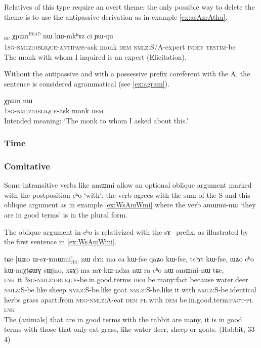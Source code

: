 \documentclass[oldfontcommands,oneside,a4paper,11pt]{article}
\newcommand{\ipa}[1]{{\phon #1}} %
\newcommand{\topic}{\textsc{dem}}
\newcommand{\tete}{\textsuperscript{\textsc{head}}}
\newcommand{\rc}{\textsubscript{\textsc{rc}}}
\begin{document}
Relatives of this type require an overt theme; the only possible way to delete the theme is to use the antipassive derivation   as in example \ref{ex:asAzrAthu}.

\begin{exe}
\ex \label{ex:asAzrAthu}
\gll [\ipa{a-sɤz-rɤ-tʰu}]\rc{}  	\ipa{χpɯn}\tete{}  	\ipa{nɯ}  	\ipa{kɯ-mkʰɤz}  	\ipa{ci}  	\ipa{ɲɯ-ŋu}    \\
\textsc{1sg-nmlz:oblique-antipass}-ask monk \topic{}  \textsc{nmlz:}S/A-expert \textsc{indef} \textsc{testim}-be \\
\glt The monk   with whom I inquired  is an expert (Elicitation). 
\end{exe} 

Without the antipassive and with a possessive prefix coreferent with the A, the sentence is considered agrammatical (see \ref{ex:agram}).

\begin{exe}
\ex \label{ex:agram}
\gll *\ipa{a-sɤ-tʰu}  	\ipa{χpɯn}  	\ipa{nɯ}  	  \\
\textsc{1sg-nmlz:oblique}-ask monk \topic{}   \\
\glt Intended meaning: `The monk   to whom I asked about this.'
\end{exe} 


\subsubsection{Time}
\subsubsection{Comitative} \label{sec:rel:comitative}
Some intransitive verbs like \ipa{amɯmi}  allow an optional oblique argument marked with the postposition \ipa{cʰo} `with'; the verb agrees with the sum of the S and this oblique argument as in example \ref{ex:WsAmWmi} where the verb 	\ipa{amɯmi-nɯ}  `they are in good terms' is in the plural form.
 

The oblique argument in \ipa{cʰo} is relativized with the \ipa{sɤ}-- prefix, as illustrated by the first sentence in \ref{ex:WsAmWmi}.
\begin{exe}
   \ex \label{ex:WsAmWmi}
 \gll 
\ipa{tɕe}   	[\ipa{ɯʑo}   	\ipa{ɯ-sɤ-ɤmɯmi}]\rc{}   	\ipa{nɯ}   	\ipa{dɤn}   	\ipa{ma}   	\ipa{ca}   	\ipa{kɯ-fse}   	\ipa{qaʑo}   	\ipa{kɯ-fse,}   	\ipa{tsʰɤt}   	\ipa{kɯ-fse,}   	 \ipa{ɯʑo}   	\ipa{cʰo}   	\ipa{kɯ-naχtɕɯɣ}   	\ipa{sɯjno,}   	\ipa{xɕɤj}   	\ipa{ma}   	\ipa{mɤ-kɯ-ndza}   	\ipa{nɯ} \ipa{ra}   	\ipa{cʰo}   	\ipa{nɯ}   	\ipa{amɯmi-nɯ}   	\ipa{tɕe,}   \\
\textsc{lnk} it \textsc{3sg-nmlz:oblique}-be.in.good.terms \topic{} be.many:{fact} because water.deer \textsc{nmlz:S}-be.like sheep \textsc{nmlz:S}-be.like goat  \textsc{nmlz:S}-be.like it with  \textsc{nmlz:S}-be.identical herbs grass apart.from \textsc{neg-nmlz:A}-eat \textsc{dem} \textsc{pl} with \textsc{dem} be.in.good.term:\textsc{fact}-\textsc{pl} \textsc{lnk} \\
\glt The (animals) that are in good terms with the rabbit are many, it is in good terms with those that only eat grass, like water deer, sheep or goats. (Rabbit, 33-4)
\end{exe}
\end{document}
